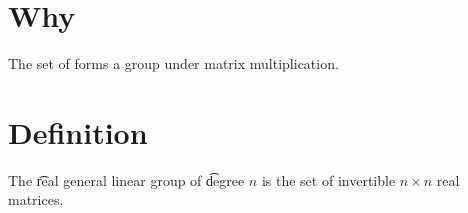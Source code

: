 
\section*{Why}

The set of forms a group under matrix multiplication.

\section*{Definition}

The \t{real general linear group} of \t{degree} $n$ is the set of invertible $n \times  n$ real matrices.

\blankpage